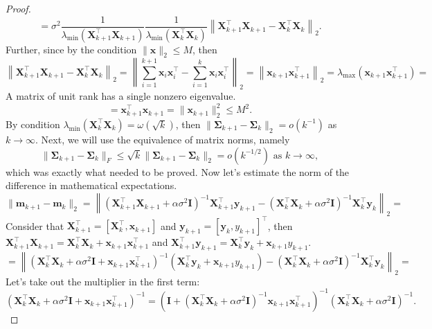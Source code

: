 \documentclass[runningheads]{llncs}
\begin{document}
\begin{proof}
    \[ = \sigma^2  \dfrac{1}{\lambda_{\min}\left( \mathbf{X}^{\top}_{k+1} \mathbf{X}_{k+1} \right)} \dfrac{1}{\lambda_{\min}\left( \mathbf{X}^{\top}_k \mathbf{X}_k \right)} \left\| \mathbf{X}^{\top}_{k+1} \mathbf{X}_{k+1} - \mathbf{X}^{\top}_k \mathbf{X}_k \right\|_2. \]
Further, since by the condition $\|\mathbf{x}\|_2 \leqslant M$, then
    \[ \left\| \mathbf{X}^{\top}_{k+1} \mathbf{X}_{k+1} - \mathbf{X}^{\top}_k \mathbf{X}_k \right\|_2 = \left\| \sum\limits_{i=1}^{k+1} \mathbf{x}_i \mathbf{x}_i^{\top} - \sum\limits_{i=1}^{k} \mathbf{x}_i \mathbf{x}_i^{\top} \right\|_2 = \left\| \mathbf{x}_{k+1} \mathbf{x}_{k+1}^{\top} \right\|_2 = \lambda_{\max}\left( \mathbf{x}_{k+1} \mathbf{x}_{k+1}^{\top} \right) = \]
    A matrix of unit rank has a single nonzero eigenvalue.
    \[= \mathbf{x}_{k+1}^{\top} \mathbf{x}_{k+1} = \| \mathbf{x}_{k+1}\|_2^2 \leqslant M^2. \]
By condition $\lambda_{\min}\left(\mathbf{X}^{\top}_k\mathbf{X}_k \right) = \omega(\sqrt{k})$, then $\|\mathbf{\Sigma}_{k+1} - \mathbf{\Sigma}_k\|_2 = o(k^{-1})$ as $k\to \infty$. Next, we will use the equivalence of matrix norms, namely
    \[ \|\mathbf{\Sigma}_{k+1} - \mathbf{\Sigma}_k \|_F \leqslant\sqrt{k}\|\mathbf{\Sigma}_{k+1} - \mathbf{\Sigma}_k\|_2 = o(k^{-1/2}) \text{ as } k\to \infty, \]
    which was exactly what needed to be proved. Now let's estimate the norm of the difference in mathematical expectations.
    \[ \| \mathbf{m}_{k+1} - \mathbf{m}_k \|_2 = \left\| \left( \mathbf{X}_{k+1}^{\top} \mathbf{X}_{k+1} + \alpha \sigma^2 \mathbf{I} \right)^{-1} \mathbf{X}_{k+1}^{\top} \mathbf{y}_{k+1} - \left( \mathbf{X}_k^{\top} \mathbf{X}_k + \alpha \sigma^2 \mathbf{I} \right)^{-1} \mathbf{X}_k^{\top} \mathbf{y}_k \right\|_2 = \]
    Consider that $\mathbf{X}_{k+1}^{\top} = [\mathbf{X}_k^{\top},\mathbf{x}_{k+1}]$ and $\mathbf{y}_{k+1} = [\mathbf{y}_k, y_{k+1}]^{\top}$, then $\mathbf{X}_{k+1}^{\top}\mathbf{X}_{k+1} = \mathbf{X}_k^{\top} \mathbf{X}_k +\mathbf{x}_{k+1} \mathbf{x}_{k+1}^{\top}$ and $\mathbf{X}_{k+1}^{\top}\mathbf{y}_{k+1} = \mathbf{X}_k^{\top} \mathbf{y}_k + \mathbf{x}_{k+1} y_{k+1}$.
    \[ = \left\| \left( \mathbf{X}_k^{\top} \mathbf{X}_k + \alpha \sigma^2 \mathbf{I} + \mathbf{x}_{k+1} \mathbf{x}_{k+1}^{\top} \right)^{-1} \left( \mathbf{X}_k^{\top} \mathbf{y}_k + \mathbf{x}_{k+1} y_{k+1} \right) - \left( \mathbf{X}_k^{\top} \mathbf{X}_k + \alpha \sigma^2 \mathbf{I} \right)^{-1} \mathbf{X}_k^{\top} \mathbf{y}_k \right\|_2 = \]
    Let's take out the multiplier in the first term:
\[\left(\mathbf{X}_k^{\top} \mathbf{X}_k+ \alpha\sigma^2 \mathbf{I} +\mathbf{x}_{k+1}\mathbf{x}_{k+1}^{\top}\right)^{-1}= \left(\mathbf{I} + \left( \mathbf{X}_k^{\top}\mathbf{X}_k +\alpha \sigma^2 \mathbf{I}\right)^{-1}\mathbf{x}_{k+1}\mathbf{x}_{k+1}^{\top}\right)^{-1} \left(\mathbf{X}_k^{\top} \mathbf{X}_k + \alpha \sigma^2 \mathbf{I}\right)^{-1}.\]

\end{proof}
\end{document}
